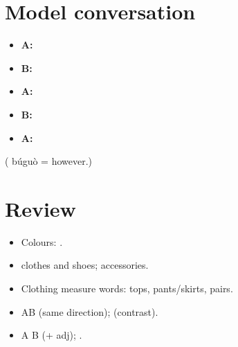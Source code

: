 \section{Model conversation}

\begin{itemize}
  \item \textbf{A:} 
  \item \textbf{B:} 
  \item \textbf{A:} 
  \item \textbf{B:} 
  \item \textbf{A:} 
\end{itemize}
( búguò = however.)

\section*{Review}
\begin{itemize}
  \item Colours: .
  \item {} clothes and shoes;  accessories.
  \item Clothing measure words:  tops,  pants/skirts,  pairs.
  \item {}AB (same direction);  (contrast).
  \item A  B (+ adj); .
\end{itemize}

